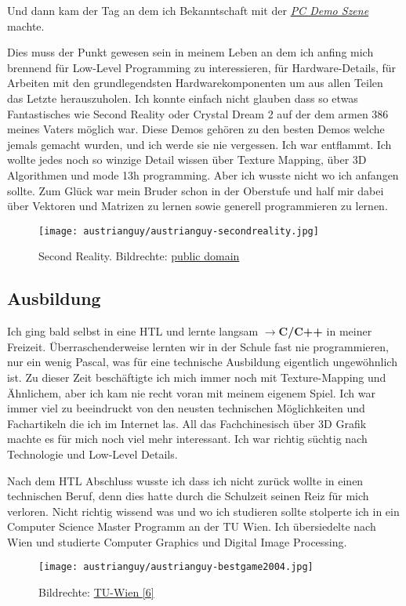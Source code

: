 Und dann kam der Tag an dem ich Bekanntschaft mit der \href{https://de.wikipedia.org/wiki/Demoszene}{\textit{PC Demo Szene}} machte.

Dies muss der Punkt gewesen sein in meinem Leben an dem ich anfing mich brennend für Low-Level Programming zu interessieren, für Hardware-Details, für Arbeiten mit den grundlegendsten Hardwarekomponenten um aus allen Teilen das Letzte herauszuholen. Ich konnte einfach nicht glauben dass so etwas Fantastisches wie Second Reality oder Crystal Dream 2 auf der dem armen 386 meines Vaters möglich war. Diese Demos gehören zu den besten Demos welche jemals gemacht wurden, und ich werde sie nie vergessen. Ich war entflammt. Ich wollte jedes noch so winzige Detail wissen über Texture Mapping, über 3D Algorithmen und mode 13h programming. Aber ich wusste nicht wo ich anfangen sollte. Zum Glück war mein Bruder schon in der Oberstufe und half mir dabei über Vektoren und Matrizen zu lernen sowie generell programmieren zu lernen.

\begin{figure}
\texttt{[image: austrianguy/austrianguy-secondreality.jpg]}\\
\caption{Second Reality. Bildrechte: \href{https://en.wikipedia.org/wiki/en:public_domain}{public domain}}
\end{figure}

\subsection*{Ausbildung}

Ich ging bald selbst in eine HTL und lernte langsam \textbf{$\rightarrow$C/C++} in meiner Freizeit. Überraschenderweise lernten wir in der Schule fast nie programmieren, nur ein wenig Pascal, was für eine technische Ausbildung eigentlich ungewöhnlich ist. Zu dieser Zeit beschäftigte ich mich immer noch mit Texture-Mapping und Ähnlichem, aber ich kam nie recht voran mit meinem eigenem Spiel. Ich war immer viel zu beeindruckt von den neusten technischen Möglichkeiten und Fachartikeln die ich im Internet las. All das Fachchinesisch über 3D Grafik machte es für mich noch viel mehr interessant. Ich war richtig süchtig nach Technologie und Low-Level Details.

Nach dem HTL Abschluss wusste ich dass ich nicht zurück wollte in einen technischen Beruf, denn dies hatte durch die Schulzeit seinen Reiz für mich verloren. Nicht richtig wissend was und wo ich studieren sollte stolperte ich in ein Computer Science Master Programm an der TU Wien. Ich übersiedelte nach Wien und studierte Computer Graphics und Digital Image Processing.
\begin{figure}
    \texttt{[image: austrianguy/austrianguy-bestgame2004.jpg]}
    \caption{Bildrechte: \href{http://www.cg.tuwien.ac.at/courses/CG23/HallOfFame/2004/}{TU-Wien [6]}}
\end{figure}
